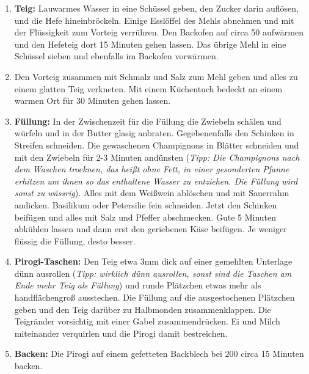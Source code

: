 \documentclass[a4paper]{recipe}
\begin{document}
 

\begin{enumerate}[label=\textbf{\color{yellowcolor}\Roman*}.]
\addtolength{\itemindent}{2em}
 \item \textbf{Teig:} Lauwarmes Wasser in eine Schüssel geben, den Zucker darin auflösen, und die Hefe hineinbröckeln. Einige Esslöffel des Mehls abnehmen und mit der Flüssigkeit zum Vorteig verrühren. Den Backofen auf circa 50\textcelsius{} aufwärmen und den Hefeteig dort 15 Minuten gehen lassen. Das übrige Mehl in eine Schüssel sieben und ebenfalls im Backofen vorwärmen. 
%
 \item Den Vorteig zusammen mit Schmalz und Salz zum Mehl geben und alles zu einem glatten Teig verkneten. Mit einem Küchentuch bedeckt an einem warmen Ort für 30 Minuten gehen lassen. 
%
\item \textbf{Füllung:} In der Zwischenzeit für die Füllung die Zwiebeln schälen und würfeln und in der Butter glasig anbraten. Gegebenenfalls den Schinken in Streifen schneiden. Die gewaschenen Champignons in Blätter schneiden und mit den Zwiebeln für 2-3 Minuten andünsten (\textsl{Tipp: Die Champignons nach dem Waschen trocknen, das heißt ohne Fett, in einer gesonderten Pfanne erhitzen um ihnen so das enthaltene Wasser zu entziehen. Die Füllung wird sonst zu wässrig}). Alles mit dem Weißwein ablöschen und mit Sauerrahm andicken. Basilikum oder Petersilie fein schneiden. Jetzt den Schinken beifügen und alles mit Salz und Pfeffer abschmecken. Gute 5 Minuten abkühlen lassen und dann erst den geriebenen Käse beifügen. Je weniger flüssig die Füllung, desto besser.
%
\item \textbf{Pirogi-Taschen:} Den Teig etwa 3mm dick auf einer gemehlten Unterlage dünn ausrollen (\textsl{Tipp: wirklich dünn ausrollen, sonst sind die Taschen am Ende mehr Teig als Füllung}) und runde Plätzchen etwas mehr als handflächengroß ausstechen. Die Füllung auf die ausgestochenen Plätzchen geben und den Teig darüber zu Halbmonden zusammenklappen. Die Teigränder vorsichtig mit einer Gabel zusammendrücken. Ei und Milch miteinander verquirlen und die Pirogi damit bestreichen.

\item \textbf{Backen:} Die Pirogi auf einem gefetteten Backblech bei 200\textcelsius{} circa 15 Minuten backen.

\end{enumerate}
\end{document}
